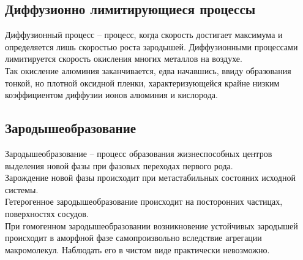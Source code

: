 \documentclass[14pt,a4paper]{scrartcl}
\begin{document}
\subsection*{Диффузионно лимитирующиеся процессы}
Диффузионный процесс -- процесс, когда скорость достигает максимума и определяется лишь скоростью роста зародышей. Диффузионными процессами лимитируется скорость окисления многих металлов на воздухе.\\
Так окисление алюминия заканчивается, едва начавшись, ввиду образования тонкой, но плотной оксидной пленки, характеризующейся крайне низким коэффициентом диффузии ионов алюминия и кислорода.
\subsection*{Зародышеобразование}
Зародышеобразование -- процесс образования жизнеспособных центров выделения новой фазы при фазовых переходах первого рода. \\
Зарождение новой фазы происходит при метастабильных состояних исходной системы. \\
Гетерогенное зародышеобразование происходит на посторонних частицах, поверхностях сосудов. \\
При гомогенном зародышеобразовании возникновение устойчивых зародышей происходит в аморфной фазе самопроизвольно вследствие агрегации макромолекул. Наблюдать его в чистом виде практически невозможно.
\end{document}
